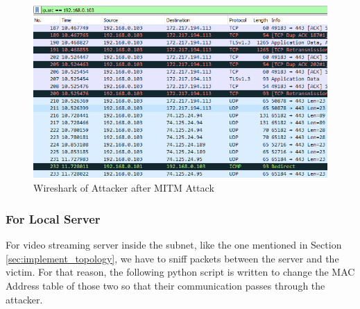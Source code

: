 \documentclass[14pt]{extarticle}
\begin{document}
            \begin{figure}
                \centering
                \includegraphics[width=.95\textwidth]{Pictures/MITM_Gateway/AfterMITM_Attacker.png}
                \caption{Wireshark of Attacker after MITM Attack}
                \label{fig:MITM_Gateway_Wireshark}
            \end{figure}
            
        \subsubsection{For Local Server}
             For video streaming server inside the subnet, like the one mentioned in Section \ref{sec:implement_topology}, we have to sniff packets between the server and the victim. For that reason, the following python script is written to change the MAC Address table of those two so that their communication passes through the attacker.
            
            
\end{document}
